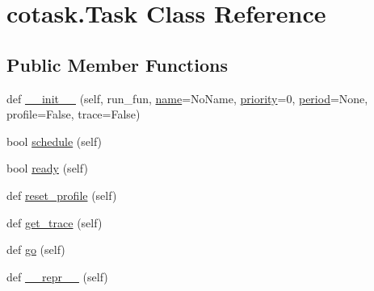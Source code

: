 \hypertarget{classcotask_1_1_task}{}\section{cotask.\+Task Class Reference}
\label{classcotask_1_1_task}
\subsection*{Public Member Functions}
\begin{DoxyCompactItemize}
\item 
def \mbox{\hyperlink{classcotask_1_1_task_a20a30d252e750706e77553a6244ae457}{\+\_\+\+\_\+init\+\_\+\+\_\+}} (self, run\+\_\+fun, \mbox{\hyperlink{classcotask_1_1_task_ab54e069dd0b4f0a2f8e7f00c94998a10}{name}}=\textquotesingle{}No\+Name\textquotesingle{}, \mbox{\hyperlink{classcotask_1_1_task_aeced93c7b7d23e33de9693d278aef88b}{priority}}=0, \mbox{\hyperlink{classcotask_1_1_task_a44f980f61f1908764c6821fa886590ca}{period}}=None, profile=False, trace=False)
\item 
bool \mbox{\hyperlink{classcotask_1_1_task_af60def0ed4a1bc5fec32f3cf8b8a90c8}{schedule}} (self)
\item 
bool \mbox{\hyperlink{classcotask_1_1_task_a6102bc35d7cb1ce292abc85d4ddc23e1}{ready}} (self)
\item 
def \mbox{\hyperlink{classcotask_1_1_task_a1bcbfa7dd7086112af20b7247ffa4a2e}{reset\+\_\+profile}} (self)
\item 
def \mbox{\hyperlink{classcotask_1_1_task_a6e51a228f985aec8c752bd72a73730ae}{get\+\_\+trace}} (self)
\item 
def \mbox{\hyperlink{classcotask_1_1_task_a78e74d18a5ba94074c2b5309394409a5}{go}} (self)
\item 
def \mbox{\hyperlink{classcotask_1_1_task_a2dcb50b9bf2676dfaac176649bc7d3f9}{\+\_\+\+\_\+repr\+\_\+\+\_\+}} (self)
\end{DoxyCompactItemize}
